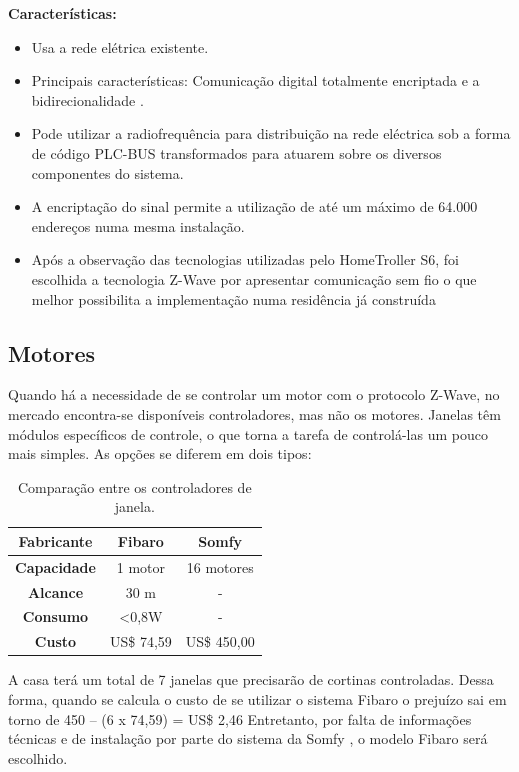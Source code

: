 \textbf{Características:}
\begin{itemize}
\item Usa a rede elétrica existente.
\item Principais características: Comunicação digital totalmente encriptada e a bidirecionalidade \cite{PLCMKTI}.
\item Pode utilizar a radiofrequência para distribuição na rede eléctrica sob a forma de código PLC-BUS transformados para atuarem sobre os diversos componentes do sistema.
\item A encriptação do sinal permite a utilização de até um máximo de 64.000 endereços numa mesma instalação\cite{PLCMKTI}. 
\item Após a observação das tecnologias utilizadas pelo HomeTroller S6, foi escolhida a tecnologia Z-Wave por apresentar comunicação sem fio o que melhor possibilita a implementação numa residência já construída
\end{itemize}

\subsection{Motores}

	Quando há a necessidade de se controlar um motor com o protocolo Z-Wave, no mercado encontra-se disponíveis controladores, mas não os motores. Janelas têm módulos específicos de controle, o que torna a tarefa de controlá-las um pouco mais simples. As opções se diferem em dois tipos:

\begin{table}
\centering
\begin{tabular}{|c|c|c|}
\hline 
\textbf{Fabricante} & \textbf{Fibaro} & \textbf{Somfy}\tabularnewline
\hline 
\hline 
\textbf{Capacidade} & 1 motor & 16 motores\tabularnewline
\hline 
\textbf{Alcance} & 30 m & -\tabularnewline
\hline 
\textbf{Consumo} & <0,8W & -\tabularnewline
\hline 
\textbf{Custo} & US\$ 74,59 & US\$ 450,00\tabularnewline
\hline 
\end{tabular}\caption{Comparação entre os controladores de janela.}
\end{table}

	A casa terá um total de 7 janelas que precisarão de cortinas controladas. Dessa forma, quando se calcula o custo de se utilizar o sistema Fibaro\cite{Manualaitesas}\cite{Valoraitesas} o prejuízo sai em torno de 450 – (6 x 74,59) = US\$ 2,46 Entretanto, por falta de informações técnicas e de instalação por parte do sistema da Somfy \cite{Caracteristicasaitesas}, o modelo Fibaro será escolhido. 

